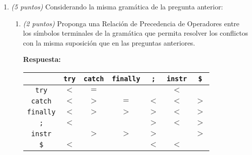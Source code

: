 \documentclass[a4paper,10pt]{article}
\begin{document}
\begin{enumerate}
\begin{enumerate}
            \textbf{Respuesta:} Los conflictos se resolvieron en el mismo
            \href{https://github.com/ArriagaAmin/LenguajesIIParcial1/blob/main/Pregunta1/MC_LR1}{archivo} 
            de la pregunta anterior.\\

            \item \textit{(2 puntos)} A partir de las respuestas anteriores, construya la m\'aquina 
            caracterı\'istica \textit{LALR(1)} y diga si existen conflictos en el mismo. En caso de 
            existir, explique c\'omo los resolverı\'ia (seleccionando una de las acciones que conforma 
            dicho conflicto), con las mismas reglas de la pregunta anterior.

            \textbf{Respuesta:} Se coloc\'o la m\'aquina caracter\'istica, sus conflictos y la forma de 
            resolverlos en el siguiente \href{https://github.com/ArriagaAmin/LenguajesIIParcial1/blob/main/Pregunta1/MC_LALR1}{archivo} 
            del repositorio.\\
        \end{enumerate}

        \newpage

        \item \textit{(5 puntos)} Considerando la misma gram\'atica de la pregunta anterior:
        
        \begin{enumerate}
            \item \textit{(2 puntos)} Proponga una Relaci\'on de Precedencia de Operadores entre los 
            s\'imbolos terminales de la gram\'atica que permita resolver los conflictos con la misma 
            suposici\'on que en las preguntas anteriores. 
            
            \textbf{Respuesta:}
            \begin{center}
                \begin{tabular}{ | c | c | c | c | c | c | c |}
                    \hline
                    & \verb|try| & \verb|catch| & \verb|finally| & \verb|;| & \verb|instr| & \verb|$| \\ \hline
                    \verb|try| & $<$ & $=$ & & & $<$ & \\ \hline
                    \verb|catch| & $<$ & $>$ & $=$ & $<$ & $<$ & $>$ \\ \hline 
                    \verb|finally| & $<$ & $>$ & $>$ & $>$ & $<$ & $>$ \\ \hline 
                    \verb|;| & $<$ & & & $>$ & $<$ & $>$ \\ \hline 
                    \verb|instr| & & $>$ & $>$ & $>$ & & $>$ \\ \hline 
                    \verb|$| & $<$ & & & $<$ & $<$ & \\ \hline
                \end{tabular}
            \end{center}
            \vspace*{1cm}


\end{enumerate}
\end{enumerate}
\end{document}
